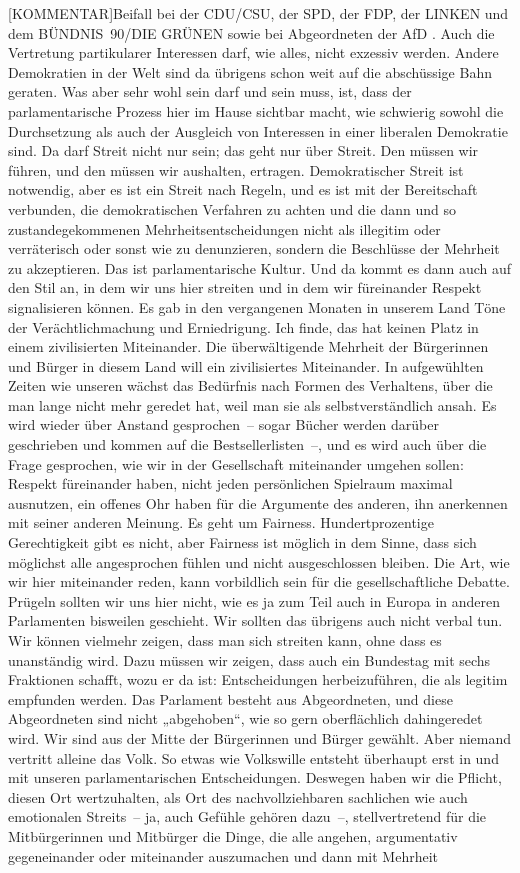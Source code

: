 \documentclass[a4paper,11pt]{article}
\begin{document}
[KOMMENTAR]Beifall bei der CDU/CSU, der SPD, der FDP, der LINKEN und dem BÜNDNIS 90/DIE GRÜNEN sowie bei Abgeordneten der AfD
. Auch die Vertretung partikularer Interessen darf, wie alles, nicht exzessiv werden. Andere Demokratien in der Welt sind da übrigens schon weit auf die abschüssige Bahn geraten. Was aber sehr wohl sein darf und sein muss, ist, dass der parlamentarische Prozess hier im Hause sichtbar macht, wie schwierig sowohl die Durchsetzung als auch der Ausgleich von Interessen in einer liberalen Demokratie sind. Da darf Streit nicht nur sein; das geht nur über Streit. Den müssen wir führen, und den müssen wir aushalten, ertragen. Demokratischer Streit ist notwendig, aber es ist ein Streit nach Regeln, und es ist mit der Bereitschaft verbunden, die demokratischen Verfahren zu achten und die dann und so zustandegekommenen Mehrheitsentscheidungen nicht als illegitim oder verräterisch oder sonst wie zu denunzieren, sondern die Beschlüsse der Mehrheit zu akzeptieren. Das ist parlamentarische Kultur. Und da kommt es dann auch auf den Stil an, in dem wir uns hier streiten und in dem wir füreinander Respekt signalisieren können. Es gab in den vergangenen Monaten in unserem Land Töne der Verächtlichmachung und Erniedrigung. Ich finde, das hat keinen Platz in einem zivilisierten Miteinander. Die überwältigende Mehrheit der Bürgerinnen und Bürger in diesem Land will ein zivilisiertes Miteinander. In aufgewühlten Zeiten wie unseren wächst das Bedürfnis nach Formen des Verhaltens, über die man lange nicht mehr geredet hat, weil man sie als selbstverständlich ansah. Es wird wieder über Anstand gesprochen – sogar Bücher werden darüber geschrieben und kommen auf die Bestsellerlisten –, und es wird auch über die Frage gesprochen, wie wir in der Gesellschaft miteinander umgehen sollen: Respekt füreinander haben, nicht jeden persönlichen Spielraum maximal ausnutzen, ein offenes Ohr haben für die Argumente des anderen, ihn anerkennen mit seiner anderen Meinung. Es geht um Fairness. Hundertprozentige Gerechtigkeit gibt es nicht, aber Fairness ist möglich in dem Sinne, dass sich möglichst alle angesprochen fühlen und nicht ausgeschlossen bleiben. Die Art, wie wir hier miteinander reden, kann vorbildlich sein für die gesellschaftliche Debatte. Prügeln sollten wir uns hier nicht, wie es ja zum Teil auch in Europa in anderen Parlamenten bisweilen geschieht. Wir sollten das übrigens auch nicht verbal tun. Wir können vielmehr zeigen, dass man sich streiten kann, ohne dass es unanständig wird. Dazu müssen wir zeigen, dass auch ein Bundestag mit sechs Fraktionen schafft, wozu er da ist: Entscheidungen herbeizuführen, die als legitim empfunden werden. Das Parlament besteht aus Abgeordneten, und diese Abgeordneten sind nicht „abgehoben“, wie so gern oberflächlich dahingeredet wird. Wir sind aus der Mitte der Bürgerinnen und Bürger gewählt. Aber niemand vertritt alleine das Volk. So etwas wie Volkswille entsteht überhaupt erst in und mit unseren parlamentarischen Entscheidungen. Deswegen haben wir die Pflicht, diesen Ort wertzuhalten, als Ort des nachvollziehbaren sachlichen wie auch emotionalen Streits – ja, auch Gefühle gehören dazu –, stellvertretend für die Mitbürgerinnen und Mitbürger die Dinge, die alle angehen, argumentativ gegeneinander oder miteinander auszumachen und dann mit Mehrheit 
\end{document}
